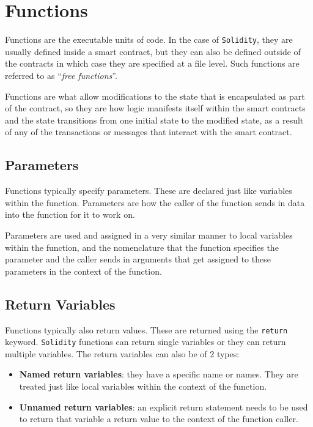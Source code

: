 \section{Functions}\label{functions}

Functions are the executable units of code. In the case of
\texttt{Solidity}, they are usually defined inside a smart contract, but
they can also be defined outside of the contracts in which case they are
specified at a file level. Such functions are referred to as
``\emph{free functions}''.

Functions are what allow modifications to the state that is encapsulated
as part of the contract, so they are how logic manifests itself within
the smart contracts and the state transitions from one initial state to
the modified state, as a result of any of the transactions or messages
that interact with the smart contract.

\subsection{Parameters}\label{parameters}

Functions typically specify parameters. These are declared just like
variables within the function. Parameters are how the caller of the
function sends in data into the function for it to work on.

Parameters are used and assigned in a very similar manner to local
variables within the function, and the nomenclature that the function
specifies the parameter and the caller sends in arguments that get
assigned to these parameters in the context of the function.

\subsection{Return Variables}\label{return-variables}

Functions typically also return values. These are returned using the
\texttt{return} keyword. \texttt{Solidity} functions can return single
variables or they can return multiple variables. The return variables
can also be of 2 types:

\begin{itemize}
\tightlist
\item
  \textbf{Named return variables}: they have a specific name or names.
  They are treated just like local variables within the context of the
  function.
\item
  \textbf{Unnamed return variables}: an explicit return statement needs
  to be used to return that variable a return value to the context of
  the function caller.
\end{itemize}

